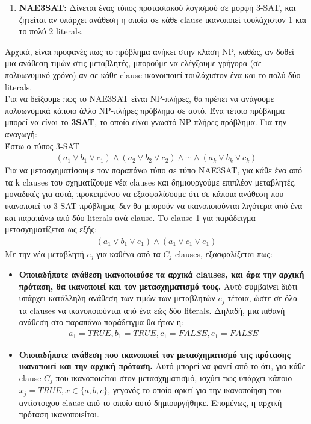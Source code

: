 \documentclass{article}
\begin{document}
\begin{enumerate}[label=(\alph*)]
\begin{enumerate}[label = \arabic*]
\item \textbf{NAE3SAT:} Δίνεται ένας τύπος προτασιακού λογισμού σε μορφή 3-SAT, και ζητείται αν υπάρχει ανάθεση η οποία σε κάθε clause ικανοποιεί τουλάχιστον 1 και το πολύ 2 literals. 
\end{enumerate}
Αρχικά, είναι προφανές πως το πρόβλημα ανήκει στην κλάση NP, καθώς, αν δοθεί μια ανάθεση τιμών στις μεταβλητές, μπορούμε να ελέγξουμε γρήγορα (σε πολυωνυμικό χρόνο) αν σε κάθε clause ικανοιποιεί τουλάχιστον ένα και το πολύ δύο literals. \\
Για να δείξουμε πως το NAE3SAT είναι NP-πλήρες, θα πρέπει να ανάγουμε πολυωνυμικά κάποιο άλλο NP-πλήρες πρόβλημα σε αυτό. Ένα τέτοιο πρόβλημα μπορεί να είναι το \textbf{3SAT}, το οποίο είναι γνωστό NP-πλήρες πρόβλημα. Για την αναγωγή:  \\
Έστω ο τύπος 3-SAT 
\begin{align*}
(a_{1}\lor b_{1}\lor c_{1})\land (a_{2}\lor b_{2}\lor c_{2})  \land \cdots \land (a_{k}\lor b_{k}\lor c_{k})
\end{align*}
Για να μετασχηματίσουμε τον παραπάνω τύπο σε τύπο NAE3SAT, για κάθε ένα από τα k clauses του σχηματίζουμε νέα clauses και δημιουργούμε επιπλέον μεταβλητές, μοναδικές για αυτά, προκειμένου να εξασφαλίσουμε ότι σε κάποια ανάθεση που ικανοποιεί το 3-SAT πρόβλημα, δεν θα μπορούν να ικανοποιούνται λιγότερα από ένα και παραπάνω από δύο literals ανά clause. Το clause 1 για παράδειγμα μετασχηματίζεται ως εξής: 
\begin{align*}
(a_1\lor b_1 \lor e_1)\land (a_1 \lor c_1 \lor \overline{e_1})
\end{align*}
Με την νέα μεταβλητή $e_j$ για καθένα από τα $C_j$ clauses, εξασφαλίζεται πως:
\begin{itemize}
\item \textbf{Οποιαδήποτε ανάθεση ικανοποιούσε τα αρχικά clauses, και άρα την αρχική πρόταση, θα ικανοποιεί και τον μετασχηματισμό τους.} Αυτό συμβαίνει διότι υπάρχει κατάλληλη ανάθεση των τιμών των μεταβλητών $e_j$ τέτοια, ώστε σε όλα τα clauses να ικανοποιούνται από ένα εώς δύο literals. Δηλαδή, μια πιθανή ανάθεση στο παραπάνω παράδειγμα θα ήταν η:
\begin{align*}
a_1 = TRUE, b_1 = TRUE, c_1 = FALSE, e_1 = FALSE
\end{align*}
\item \textbf{Οποιαδήποτε ανάθεση που ικανοποιεί τον μετασχηματισμό της πρότασης ικανοποιεί και την αρχική πρόταση.} Αυτό μπορεί να φανεί από το ότι, για κάθε clause $C_j$ που ικανοποιείται στον μετασχηματισμό, ισχύει πως υπάρχει κάποιο $x_j = TRUE, x \in \{a, b, c\}$, γεγονός το οποίο αρκεί για την ικανοποίηση του αντίστοιχου clause από το οποίο αυτό δημιουργήθηκε. Επομένως, η αρχική πρόταση ικανοποιείται. 

\end{itemize}
\end{enumerate}
\end{document}
